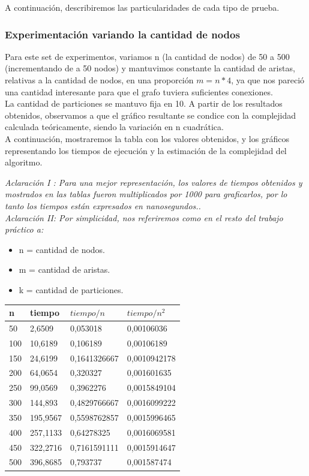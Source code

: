 \documentclass[10pt,a4paper]{article}
\begin{document}
\noindent A continuación, describiremos las particularidades de cada tipo de prueba.

\subsubsection{Experimentación variando la cantidad de nodos}

Para este set de experimentos, variamos n (la cantidad de nodos) de 50 a 500 (incrementando de a 50 nodos) y mantuvimos constante la cantidad de aristas, relativas a la cantidad de nodos, en una proporción $m = n*4$, ya que nos pareció una cantidad interesante para que el grafo tuviera suficientes conexiones.\\ La cantidad de particiones se mantuvo fija en 10.
A partir de los resultados obtenidos, observamos a que el gráfico resultante se condice con la complejidad calculada teóricamente, siendo la variación en n cuadrática.\\
A continuación, mostraremos la tabla con los valores obtenidos, y los gráficos representando los tiempos de ejecución y la estimación de la complejidad del algoritmo.

\noindent \textit{Aclaración I : Para una mejor representación, los valores de tiempos obtenidos y mostrados en las tablas fueron multiplicados por 1000 para graficarlos, por lo tanto los tiempos están expresados en nanosegundos..}\\

\noindent \textit{Aclaración II: Por simplicidad, nos referiremos como en el resto del trabajo práctico a:}\\

\noindent \begin{itemize}
\item n = cantidad de nodos.
\item m = cantidad de aristas.
\item k = cantidad de particiones.
\end{itemize}

\begin{center}
	\begin{tabular}{| l | l | l | l |}
	\hline
	n & tiempo & $tiempo/n$ & $tiempo/n^2$\\ \hline
	50 & 2,6509 & 0,053018 & 0,00106036\\
	100 & 10,6189 & 0,106189 & 0,00106189\\
	150 & 24,6199 & 0,1641326667 & 0,0010942178\\
	200	& 64,0654 & 0,320327 & 0,001601635\\
	250 & 99,0569 & 0,3962276 & 0,0015849104\\
	300 & 144,893 & 0,4829766667 & 0,0016099222\\
	350 & 195,9567 & 0,5598762857 & 0,0015996465\\
	400 & 257,1133 & 0,64278325 & 0,0016069581\\
	450 & 322,2716 & 0,7161591111 & 0,0015914647\\
	500	& 396,8685 & 0,793737 & 0,001587474\\
	\hline
	\end{tabular}
\end{center}
\end{document}
